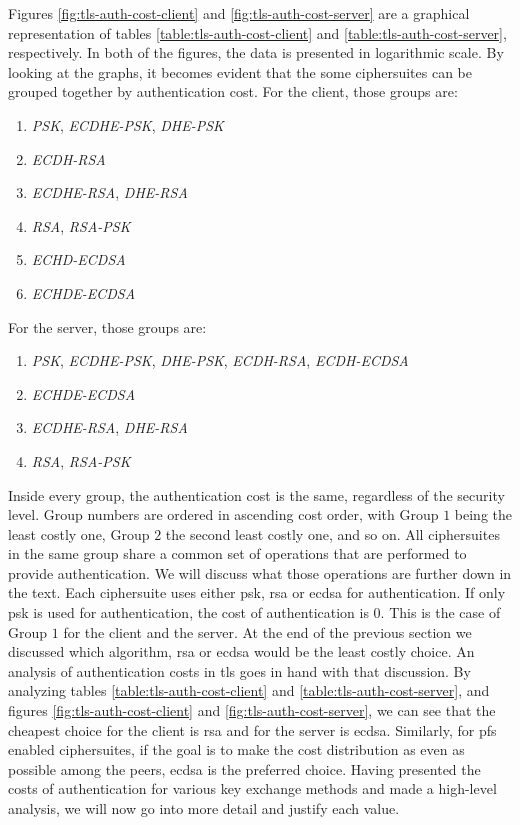 Figures \ref{fig:tls-auth-cost-client} and \ref{fig:tls-auth-cost-server} are a graphical representation of tables \ref{table:tls-auth-cost-client} and \ref{table:tls-auth-cost-server},
respectively. In both of the figures, the data is presented in logarithmic scale. By looking at the graphs, it becomes evident that the some ciphersuites can be grouped together by authentication cost.
For the client, those groups are:

\begin{enumerate}
  \item \textit{PSK}, \textit{ECDHE-PSK}, \textit{DHE-PSK}
  \item \textit{ECDH-RSA}
  \item \textit{ECDHE-RSA}, \textit{DHE-RSA}
  \item \textit{RSA}, \textit{RSA-PSK}
  \item \textit{ECHD-ECDSA}
  \item \textit{ECHDE-ECDSA}
\end{enumerate}

For the server, those groups are:

\begin{enumerate}
  \item \textit{PSK}, \textit{ECDHE-PSK}, \textit{DHE-PSK}, \textit{ECDH-RSA}, \textit{ECDH-ECDSA}
  \item \textit{ECHDE-ECDSA}
  \item \textit{ECDHE-RSA}, \textit{DHE-RSA}
  \item \textit{RSA}, \textit{RSA-PSK}
\end{enumerate}

Inside every group, the authentication cost is the same, regardless of the security level. Group numbers are ordered in ascending cost order, with Group $1$
being the least costly one, Group $2$ the second least costly one, and so on. All ciphersuites in the same group share a common set of operations that
are performed to provide authentication. We will discuss what those operations are further down in the text. Each ciphersuite uses either \gls{psk},
\gls{rsa} or \gls{ecdsa} for authentication. If only \gls{psk} is used for authentication, the cost of authentication is $0$. This is the case of Group
$1$ for the client and the server. At the end of the previous section we discussed which algorithm, \gls{rsa} or \gls{ecdsa} would be the least costly
choice. An analysis of authentication costs in \gls{tls} goes in hand with that discussion. By analyzing tables 
\ref{table:tls-auth-cost-client} and \ref{table:tls-auth-cost-server}, and figures \ref{fig:tls-auth-cost-client} and 
\ref{fig:tls-auth-cost-server}, we can see that the cheapest choice for the client is \gls{rsa} and for the
server is \gls{ecdsa}. Similarly, for \gls{pfs} enabled ciphersuites, if the goal is to make the cost distribution as even as possible among 
the peers, \gls{ecdsa} is the preferred choice. Having presented the costs of authentication for various key exchange methods 
and made a high-level analysis, we will now go into more detail and justify each value.

